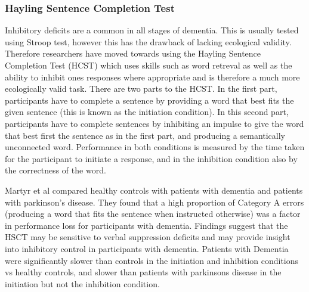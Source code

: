 \documentclass[12pt, twoside, a4paper]{article}
\begin{document}
\subsubsection{Hayling Sentence Completion Test}
Inhibitory deficits are a common in all stages of dementia. This is usually tested using Stroop test, however this has the drawback of lacking ecological validity. Therefore researchers have moved towards using the Hayling Sentence Completion Test (HCST) which uses skills such as word retreval as well as the ability to inhibit ones responses where appropriate and is therefore a much more ecologically valid task. There are two parts to the HCST. In the first part, participants have to complete a sentence by providing a word that best fits the given sentence (this is known as the initiation condition). In this second part, participants have to complete sentences by inhibiting an impulse to give the word that best first the sentence as in the first part, and producing a semantically unconnected word. Performance in both conditions is measured by the time taken for the participant to initiate a response, and in the inhibition condition also by the correctness of the word.   
\par 
Martyr et al compared healthy controls with patients with dementia and patients with parkinson's disease. They found that a high proportion of Category A errors (producing a word that fits the sentence when instructed otherwise) was a factor in performance loss for participants with dementia. Findings suggest that the HSCT may be sensitive to verbal suppression deficits and may provide insight into inhibitory control in participants with dementia. Patients with Dementia were significantly slower than controls in the initiation and inhibition conditions vs healthy controls, and slower than patients with parkinsons disease in the initiation but not the inhibition condition.
\end{document}

